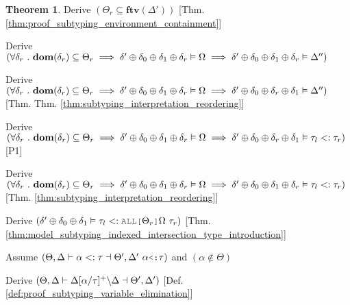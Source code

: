 \documentclass[acmsmall]{acmart}
\theoremstyle{definition}
\newtheorem{theorem}{Theorem}[section]
\begin{document}
\begin{theorem}
  \item \I\I \N Derive $(
    \Theta_r \subseteq \textbf{ftv}(\Delta')
  )$ [Thm. \ref{thm:proof_subtyping_environment_containment}]

  \item \I\I \N Derive $(
    \forall \delta_r \ .\ 
    \textbf{dom}(\delta_r) \subseteq \Theta_r 
    \implies
    \delta' \oplus \delta_0 \oplus \delta_1 \oplus \delta_r \vDash \Omega
    \implies
    \delta' \oplus \delta_0 \oplus \delta_1 \oplus \delta_r \vDash \Delta''
  )$ 

  \item \I\I \N Derive $(
    \forall \delta_r \ .\ 
    \textbf{dom}(\delta_r) \subseteq \Theta_r
    \implies
    \delta' \oplus \delta_0 \oplus \delta_1 \oplus \delta_r \vDash \Omega
    \implies
    \delta' \oplus \delta_0 \oplus \delta_r \oplus \delta_1 \vDash \Delta''
  )$ [Thm. Thm. \ref{thm:subtyping_interpretation_reordering}]

  \item \I\I \N Derive $(
    \forall \delta_r \ .\ 
    \textbf{dom}(\delta_r) \subseteq \Theta_r
    \implies
    \delta' \oplus \delta_0 \oplus \delta_1 \oplus \delta_r \vDash \Omega
    \implies
    \delta' \oplus \delta_0 \oplus \delta_r \oplus \delta_1 \vDash \tau_l <: \tau_r
  )$ [P1] 

  \item \I\I \N Derive $(
    \forall \delta_r \ .\ 
    \textbf{dom}(\delta_r) \subseteq \Theta_r
    \implies
    \delta' \oplus \delta_0 \oplus \delta_1 \oplus \delta_r \vDash \Omega
    \implies
    \delta' \oplus \delta_0 \oplus \delta_1 \oplus \delta_r \vDash \tau_l <: \tau_r
  )$ [Thm. \ref{thm:subtyping_interpretation_reordering}]

  \item \I\I \N Derive $(
    \delta' \oplus \delta_0 \oplus \delta_1 \satisfies \tau_l \subtypes \J{ALL[} \Theta_r \J{]} \Omega\ \tau_r
  )$ [Thm. \ref{thm:model_subtyping_indexed_intersection_type_introduction}]


  \item \N Assume $(
    \Theta, \Delta \entails \alpha \subtypes \tau \given \Theta', \Delta'\ \alpha\J{<:}\tau
  )$ and $(
    \alpha \notin \Theta
  )$
  \item \I \N Derive $(
    \Theta, \Delta \vdash \Delta[\alpha\slash\tau]^{+} \backslash \Delta \dashv \Theta', \Delta'
  )$ [Def. \ref{def:proof_subtyping_variable_elimination}]


\end{theorem}
\end{document}
